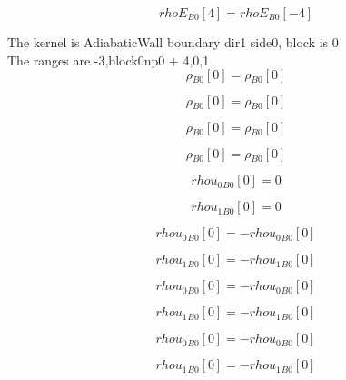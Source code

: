 \documentclass{article}
\begin{document}
\begin{dmath}{rhoE{_{B0}}}[{4}] = {rhoE{_{B0}}}[{-4}]\end{dmath}

\noindent The kernel is AdiabaticWall boundary dir1 side0, block is 0\\\noindent The ranges are -3,block0np0 + 4,0,1\\\begin{dmath}{\rho{_{B0}}}[{0}] = {\rho{_{B0}}}[{0}]\end{dmath}

\begin{dmath}{\rho{_{B0}}}[{0}] = {\rho{_{B0}}}[{0}]\end{dmath}

\begin{dmath}{\rho{_{B0}}}[{0}] = {\rho{_{B0}}}[{0}]\end{dmath}

\begin{dmath}{\rho{_{B0}}}[{0}] = {\rho{_{B0}}}[{0}]\end{dmath}

\begin{dmath}{rhou_{0}{_{B0}}}[{0}] = 0\end{dmath}

\begin{dmath}{rhou_{1}{_{B0}}}[{0}] = 0\end{dmath}

\begin{dmath}{rhou_{0}{_{B0}}}[{0}] = - {rhou_{0}{_{B0}}}[{0}]\end{dmath}

\begin{dmath}{rhou_{1}{_{B0}}}[{0}] = - {rhou_{1}{_{B0}}}[{0}]\end{dmath}

\begin{dmath}{rhou_{0}{_{B0}}}[{0}] = - {rhou_{0}{_{B0}}}[{0}]\end{dmath}

\begin{dmath}{rhou_{1}{_{B0}}}[{0}] = - {rhou_{1}{_{B0}}}[{0}]\end{dmath}

\begin{dmath}{rhou_{0}{_{B0}}}[{0}] = - {rhou_{0}{_{B0}}}[{0}]\end{dmath}

\begin{dmath}{rhou_{1}{_{B0}}}[{0}] = - {rhou_{1}{_{B0}}}[{0}]\end{dmath}
\end{document}
